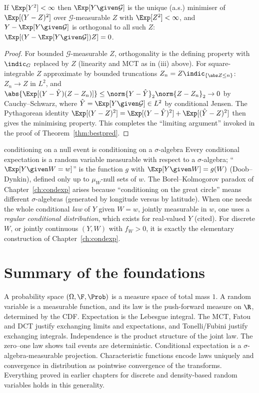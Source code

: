 \begin{theorem}\label{thm:projection}
If $\Exp[Y^2]<\infty$ then $\Exp[Y\given\mathcal G]$ is the unique (a.s.) minimiser of
$\Exp[(Y-Z)^2]$ over $\mathcal G$-measurable $Z$ with $\Exp[Z^2]<\infty$, and
$Y-\Exp[Y\given\mathcal G]$ is orthogonal to all such $Z$: $\Exp[(Y-\Exp[Y\given\mathcal G])Z]=0$.
\end{theorem}
\begin{proof}
For bounded $\mathcal G$-measurable $Z$, orthogonality is the defining property with $\indic_G$
replaced by $Z$ (linearity and MCT as in (iii) above). For square-integrable $Z$ approximate
by bounded truncations $Z_n=Z\indic_{\{\abs Z\le n\}}$: $Z_n\to Z$ in $L^2$, and
$\abs{\Exp[(Y-\hat Y)(Z-Z_n)]}\le\norm{Y-\hat Y}_2\norm{Z-Z_n}_2\to0$ by Cauchy--Schwarz,
where $\hat Y=\Exp[Y\given\mathcal G]\in L^2$ by conditional Jensen. The Pythagorean identity
$\Exp[(Y-Z)^2]=\Exp[(Y-\hat Y)^2]+\Exp[(\hat Y-Z)^2]$ then gives the minimising property. This
completes the ``limiting argument'' invoked in the proof of Theorem~\ref{thm:bestpred}.
\end{proof}

\begin{nuance}{conditioning on a null event is conditioning on a $\sigma$-algebra}
Every conditional expectation is a random variable measurable with respect to a
$\sigma$-algebra; ``$\Exp[Y\given W=w]$'' is the function $g$ with
$\Exp[Y\given W]=g(W)$ (Doob--Dynkin), defined only up to $\mu_W$-null sets of $w$. The
Borel--Kolmogorov paradox of Chapter~\ref{ch:condexp} arises because ``conditioning on the great
circle'' means different $\sigma$-algebras (generated by longitude versus by latitude).
When one needs the whole conditional \emph{law} of $Y$ given $W=w$, jointly measurable in
$w$, one uses a \emph{regular conditional distribution}, which exists for real-valued $Y$
(cited). For discrete $W$, or jointly continuous $(Y,W)$ with $f_W>0$, it is exactly the
elementary construction of Chapter~\ref{ch:condexp}.
\end{nuance}

\section{Summary of the foundations}

A probability space $(\Omega,\F,\Prob)$ is a measure space of total mass $1$. A random
variable is a measurable function, and its law is the push-forward measure on $\R$,
determined by the CDF. Expectation is the Lebesgue integral. The MCT, Fatou and DCT justify
exchanging limits and expectations, and Tonelli/Fubini justify exchanging integrals. Independence
is the product structure of the joint law. The zero--one law shows tail events are
deterministic. Conditional expectation is a $\sigma$-algebra-measurable projection.
Characteristic functions encode laws uniquely and convergence in distribution as
pointwise convergence of the transforms. Everything proved in earlier chapters for discrete
and density-based random variables holds in this generality.

